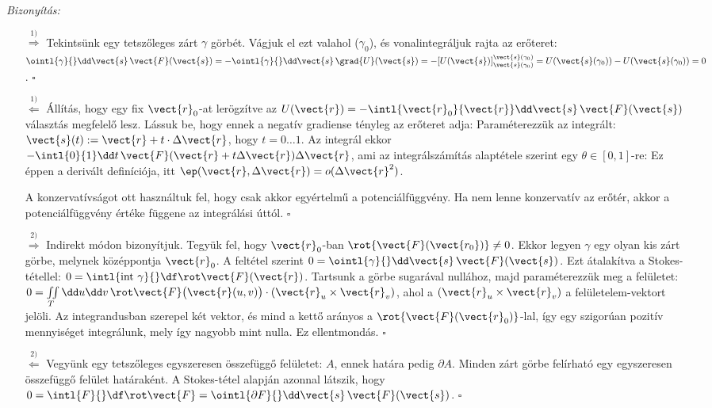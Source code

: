     \emph{Bizonyítás:}
    \begin{itemize}
     \item[$\overset{1)}{\Rightarrow}$] Tekintsünk egy tetszőleges zárt $\gamma$ görbét.
   Vágjuk el ezt valahol ($\gamma_0$), és vonalintegráljuk rajta az erőteret: $\ointl{\gamma}{}\dd\vect{s}\,\vect{F}(\vect{s})=-\ointl{\gamma}{}\dd\vect{s}\,\grad{U}(\vect{s})=-[U(\vect{s})]_{\vect{s}(\gamma_0)}^{\vect{s}(\gamma_0)}=U({\vect{s}(\gamma_0)})-U({\vect{s}(\gamma_0)})=0$. $\square$
     
     \item[$\overset{1)}{\Leftarrow}$] Állítás, hogy egy fix $\vect{r}_0$-at lerögzítve az $U(\vect{r})=-\intl{\vect{r}_0}{\vect{r}}\dd\vect{s}\,\vect{F}(\vect{s})$ választás megfelelő lesz.
   Lássuk be, hogy ennek a negatív gradiense tényleg az erőteret adja: 
     Paraméterezzük az integrált: $\vect{s}(t):=\vect{r}+t\cdot\Delta\vect{r}$, hogy $t=0\dots 1$.
   Az integrál ekkor $-\intl{0}{1}\dd t\,\vect{F}(\vect{r}+t\Delta\vect{r})\Delta\vect{r}$, ami az integrálszámítás alaptétele szerint egy $\theta\in[0,1]$-re:
     Ez éppen a derivált definíciója, itt $\ep(\vect{r},\Delta\vect{r})={o}(\Delta\vect{r}^2)$.
     
     A konzervatívságot ott használtuk fel, hogy csak akkor egyértelmű a potenciálfüggvény.
   Ha nem lenne konzervatív az erőtér, akkor a potenciálfüggvény értéke függene az integrálási úttól. $\square$
     
     \item[$\overset{2)}{\Rightarrow}$] Indirekt módon bizonyítjuk.
   Tegyük fel, hogy $\vect{r}_0$-ban $\rot{\vect{F}(\vect{r_0})}\neq 0$.
   Ekkor legyen $\gamma$ egy olyan kis zárt görbe, melynek középpontja $\vect{r}_0$.
   A feltétel szerint $0=\ointl{\gamma}{}\dd\vect{s}\,\vect{F}(\vect{s})$.
   Ezt átalakítva a Stokes-tétellel: $0=\intl{\text{int }\gamma}{}\df\rot\vect{F}(\vect{r})$.
   Tartsunk a görbe sugarával nullához, majd paraméterezzük meg a felületet: $0=\iint\limits_{T}\dd u\dd v\,\rot\vect{F}\big(\vect{r}(u,v)\big)\cdot(\vect{r}_u\times\vect{r}_v)$, ahol a $(\vect{r}_u\times\vect{r}_v)$ a felületelem-vektort jelöli.
   Az integrandusban szerepel két vektor, és mind a kettő arányos a $\rot{\vect{F}(\vect{r}_0)}$-lal, így egy szigorúan pozitív mennyiséget integrálunk, mely így nagyobb mint nulla.
   Ez ellentmondás. $\square$
     
     \item[$\overset{2)}{\Leftarrow}$] Vegyünk egy tetszőleges egyszeresen összefüggő felületet: $A$, ennek határa pedig $\partial A$.
   Minden zárt görbe felírható egy egyszeresen összefüggő felület határaként.
   A Stokes-tétel alapján azonnal látszik, hogy $0=\intl{F}{}\df\rot\vect{F}=\ointl{\partial F}{}\dd\vect{s}\,\vect{F}(\vect{s})$. $\square$
    \end{itemize}
    
